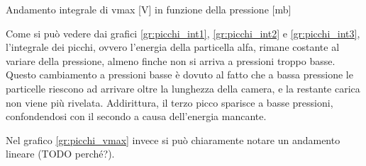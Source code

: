 \begin{grafico}
 \centering
 \caption{Andamento integrale di vmax [V] in funzione della pressione [mb]} 
 \label{gr:picchi_vmax} 
\end{grafico}

Come si può vedere dai grafici 	\autoref{gr:picchi_int1}, \autoref{gr:picchi_int2} e \autoref{gr:picchi_int3}, l'integrale dei picchi, ovvero l'energia della particella alfa, rimane costante al variare della pressione,
almeno finche non si arriva a pressioni troppo basse. Questo cambiamento a pressioni basse è dovuto al fatto che a bassa pressione le particelle riescono ad arrivare oltre la lunghezza della camera, e la restante carica non viene più rivelata.
Addirittura, il terzo picco sparisce a basse pressioni, confondendosi con il secondo a causa dell'energia mancante.

Nel grafico \autoref{gr:picchi_vmax} invece si può chiaramente notare un andamento lineare (TODO perché?).

\FloatBarrier